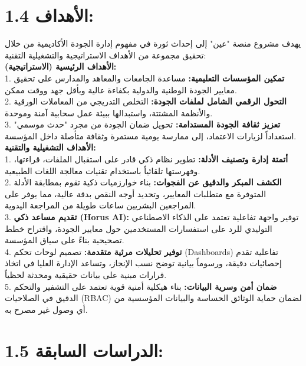 \documentclass[12pt, a4paper]{report}
\begin{document}
\begin{english}
\section*{1.4 الأهداف:}

يهدف مشروع منصة "عين" إلى إحداث ثورة في مفهوم إدارة الجودة الأكاديمية من خلال تحقيق مجموعة من الأهداف الاستراتيجية والتشغيلية التقنية: \\

\textbf{الأهداف الرئيسية (الاستراتيجية):} \\
1. \textbf{تمكين المؤسسات التعليمية:} مساعدة الجامعات والمعاهد والمدارس على تحقيق معايير الجودة الوطنية والدولية بكفاءة عالية وبأقل جهد ووقت ممكن. \\
2. \textbf{التحول الرقمي الشامل لملفات الجودة:} التخلص التدريجي من المعاملات الورقية والأنظمة المشتتة، واستبدالها ببيئة عمل سحابية آمنة وموحدة. \\
3. \textbf{تعزيز ثقافة الجودة المستدامة:} تحويل ضمان الجودة من مجرد "حدث موسمي" استعداداً لزيارات الاعتماد، إلى ممارسة يومية مستمرة وثقافة متأصلة داخل المؤسسة. \\

\textbf{الأهداف التشغيلية والتقنية:} \\
1. \textbf{أتمتة إدارة وتصنيف الأدلة:} تطوير نظام ذكي قادر على استقبال الملفات، قراءتها، وفهرستها تلقائياً باستخدام تقنيات معالجة اللغات الطبيعية. \\
2. \textbf{الكشف المبكر والدقيق عن الفجوات:} بناء خوارزميات ذكية تقوم بمطابقة الأدلة المتوفرة مع متطلبات المعايير، وتحديد أوجه النقص بدقة عالية، مما يوفر على المراجعين البشريين ساعات طويلة من المراجعة اليدوية. \\
3. \textbf{تقديم مساعد ذكي (Horus AI):} توفير واجهة تفاعلية تعتمد على الذكاء الاصطناعي التوليدي للرد على استفسارات المستخدمين حول معايير الجودة، واقتراح خطط تصحيحية بناءً على سياق المؤسسة. \\
4. \textbf{توفير تحليلات مرئية متقدمة:} تصميم لوحات تحكم (Dashboards) تفاعلية تقدم إحصائيات دقيقة، ورسوماً بيانية توضح نسب الإنجاز، وتساعد الإدارة العليا في اتخاذ قرارات مبنية على بيانات حقيقية ومحدثة لحظياً. \\
5. \textbf{ضمان أمن وسرية البيانات:} بناء هيكلية أمنية قوية تعتمد على التشفير والتحكم الدقيق في الصلاحيات (RBAC) لضمان حماية الوثائق الحساسة والبيانات المؤسسية من أي وصول غير مصرح به. \\

\section*{1.5 الدراسات السابقة:}


\end{english}
\end{document}
